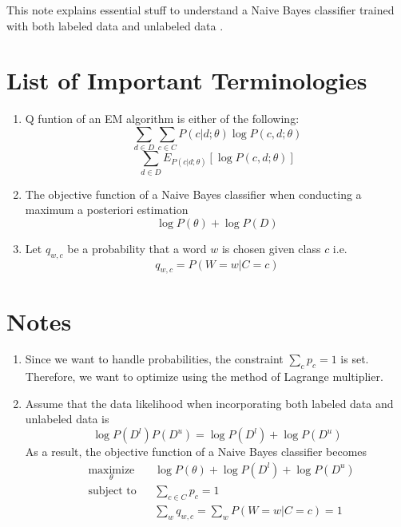 \documentclass[11pt]{article}
\begin{document}
This note explains essential stuff to understand a Naive Bayes classifier trained with both labeled data and unlabeled data \cite{nigam2000text}.


\section{List of Important Terminologies}
\begin{enumerate}
 \item Q funtion of an EM algorithm is either of the following:
$$\sum_{d \in D} \sum_{c \in C} P(c|d; \theta) \log P(c, d; \theta)$$
$$\sum_{d \in D} E_{P(c|d; \theta)}[ \log P(c, d; \theta)]$$
 \item The objective function of a Naive Bayes classifier when conducting a maximum a posteriori estimation 
$$\log P(\theta) + \log P(D)$$
\item Let $q_{w,c}$ be a probability that a word $w$ is chosen given class $c$ i.e.
$$q_{w,c} = P(W = w | C = c)$$
\end{enumerate}

\section{Notes}
\begin{enumerate}
 \item Since we want to handle probabilities, the constraint $\sum_{c} p_c = 1$ is set. Therefore, we want to optimize using the method of Lagrange multiplier.
 \item Assume that the data likelihood when incorporating both labeled data and unlabeled data is
$$\log P(D^{l})P(D^{u}) =\log P(D^{l}) + \log P(D^{u})$$
As a result, the objective function of a Naive Bayes classifier becomes 
\begin{equation*}
\begin{aligned}
& \underset{\theta}{\text{maximize}}
& & \log P(\theta) + \log P(D^{l}) + \log P(D^{u}) \\
& \text{subject to}
& & \sum_{c \in C} p_c = 1 \\
& 
& & \sum_{w} q_{w,c} = \sum_{w} P(W = w | C = c) = 1
\end{aligned}
\end{equation*}
\end{enumerate}

 



\end{document}
